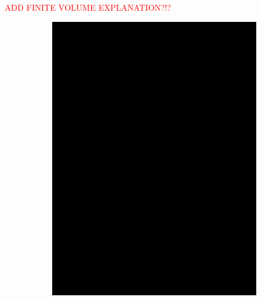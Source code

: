 \textcolor{red}{ADD FINITE VOLUME EXPLANATION?!?}

\begin{figure}
	\begin{center}
		\begin{subfigure}[b]{0.3\textwidth}
			\includegraphics[width=\textwidth]{./figures/2d_grid_test.png}
		\end{subfigure}
		\begin{subfigure}[b]{0.3\textwidth}

\end{subfigure}
\end{center}
\end{figure}
